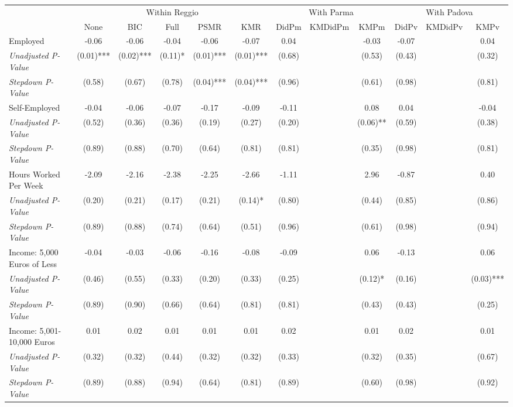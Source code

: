 \begin{tabular}{l c c c c c c c c c c c}
\toprule
& \multicolumn{5}{c}{Within Reggio} & \multicolumn{3}{c}{With Parma} & \multicolumn{3}{c}{With Padova} \\\cmidrule(lr){2-6} \cmidrule(lr){7-9} \cmidrule(lr){10-12}
 & None & BIC & Full & PSMR & KMR & DidPm & KMDidPm & KMPm & DidPv & KMDidPv & KMPv \\
\midrule
Employed & -0.06 & -0.06 & -0.04 & -0.06 & -0.07 & 0.04 & & -0.03 & -0.07 & & 0.04 \\
\quad \textit{Unadjusted P-Value} & (0.01)*** & (0.02)*** & (0.11)* & (0.01)*** & (0.01)*** & (0.68) & & (0.53) & (0.43) & & (0.32) \\
\quad \textit{Stepdown P-Value} & (0.58) & (0.67) & (0.78) & (0.04)*** & (0.04)*** & (0.96) & & (0.61) & (0.98) & & (0.81) \\
Self-Employed & -0.04 & -0.06 & -0.07 & -0.17 & -0.09 & -0.11 & & 0.08 & 0.04 & & -0.04 \\
\quad \textit{Unadjusted P-Value} & (0.52) & (0.36) & (0.36) & (0.19) & (0.27) & (0.20) & & (0.06)** & (0.59) & & (0.38) \\
\quad \textit{Stepdown P-Value} & (0.89) & (0.88) & (0.70) & (0.64) & (0.81) & (0.81) & & (0.35) & (0.98) & & (0.81) \\
Hours Worked Per Week & -2.09 & -2.16 & -2.38 & -2.25 & -2.66 & -1.11 & & 2.96 & -0.87 & & 0.40 \\
\quad \textit{Unadjusted P-Value} & (0.20) & (0.21) & (0.17) & (0.21) & (0.14)* & (0.80) & & (0.44) & (0.85) & & (0.86) \\
\quad \textit{Stepdown P-Value} & (0.89) & (0.88) & (0.74) & (0.64) & (0.51) & (0.96) & & (0.61) & (0.98) & & (0.94) \\
Income: 5,000 Euros of Less & -0.04 & -0.03 & -0.06 & -0.16 & -0.08 & -0.09 & & 0.06 & -0.13 & & 0.06 \\
\quad \textit{Unadjusted P-Value} & (0.46) & (0.55) & (0.33) & (0.20) & (0.33) & (0.25) & & (0.12)* & (0.16) & & (0.03)*** \\
\quad \textit{Stepdown P-Value} & (0.89) & (0.90) & (0.66) & (0.64) & (0.81) & (0.81) & & (0.43) & (0.43) & & (0.25) \\
Income: 5,001-10,000 Euros & 0.01 & 0.02 & 0.01 & 0.01 & 0.01 & 0.02 & & 0.01 & 0.02 & & 0.01 \\
\quad \textit{Unadjusted P-Value} & (0.32) & (0.32) & (0.44) & (0.32) & (0.32) & (0.33) & & (0.32) & (0.35) & & (0.67) \\
\quad \textit{Stepdown P-Value} & (0.89) & (0.88) & (0.94) & (0.64) & (0.81) & (0.89) & & (0.60) & (0.98) & & (0.92) \\

\end{tabular}
